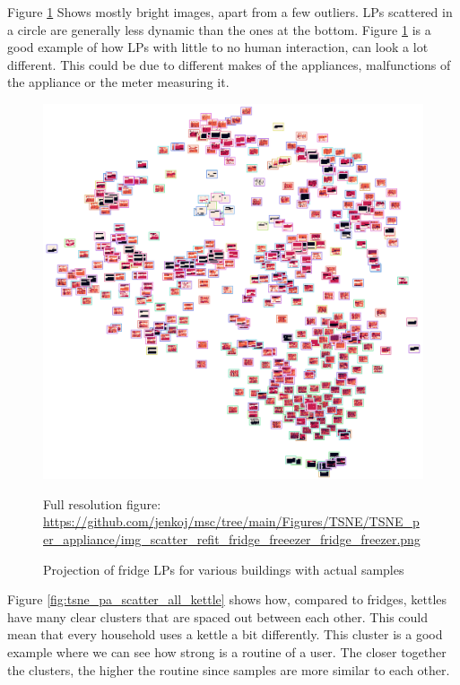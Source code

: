 Figure \ref{fig:tsne_pa_img_scatter_all_fridge} Shows mostly bright images, apart from a few outliers.
LPs scattered in a circle are generally less dynamic than the ones at the bottom.
Figure \ref{fig:tsne_pa_img_scatter_all_fridge} is a good example of how LPs with little to no human interaction, can look a lot different. 
This could be due to different makes of the appliances, malfunctions of the appliance or the meter measuring it.

\begin{figure}[H]
	\centering
	\caption{Projection of fridge LPs for various buildings with actual samples}
	\includegraphics[width=.9\textwidth]{Figures/TSNE/TSNE_per_appliance/img_scatter_refit_fridge_freeezer_fridge_freezer.png}
	\label{fig:tsne_pa_img_scatter_all_fridge}
	\par
	\par\footnotesize{Full resolution figure: \url{https://github.com/jenkoj/msc/tree/main/Figures/TSNE/TSNE_per_appliance/img_scatter_refit_fridge_freeezer_fridge_freezer.png}}
\end{figure}

Figure \ref{fig:tsne_pa_scatter_all_kettle} shows how,
compared to fridges, kettles have many clear clusters that are spaced out between each other. 
This could mean that every household uses a kettle a bit differently.
This cluster is a good example where we can see how strong is a routine of a user.
The closer together the clusters, the higher the routine since samples are more similar to each other.

